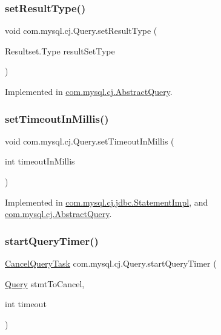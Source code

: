 \subsubsection{\texorpdfstring{set\+Result\+Type()}{setResultType()}}
{\footnotesize\ttfamily void com.\+mysql.\+cj.\+Query.\+set\+Result\+Type (\begin{DoxyParamCaption}\item[{Resultset.\+Type}]{result\+Set\+Type }\end{DoxyParamCaption})}



Implemented in \mbox{\hyperlink{classcom_1_1mysql_1_1cj_1_1_abstract_query_a169b32f7a5ede30f551d3ee53b0c4ac4}{com.\+mysql.\+cj.\+Abstract\+Query}}.

\mbox{\label{interfacecom_1_1mysql_1_1cj_1_1_query_a9bdb29806cdcfabc9bf48c9c7872d777}} 
\subsubsection{\texorpdfstring{set\+Timeout\+In\+Millis()}{setTimeoutInMillis()}}
{\footnotesize\ttfamily void com.\+mysql.\+cj.\+Query.\+set\+Timeout\+In\+Millis (\begin{DoxyParamCaption}\item[{int}]{timeout\+In\+Millis }\end{DoxyParamCaption})}



Implemented in \mbox{\hyperlink{classcom_1_1mysql_1_1cj_1_1jdbc_1_1_statement_impl_a88a77da140cb220313f9f876f08ee0a1}{com.\+mysql.\+cj.\+jdbc.\+Statement\+Impl}}, and \mbox{\hyperlink{classcom_1_1mysql_1_1cj_1_1_abstract_query_adcf9dfa4142b1922dc2fd8e09d70795a}{com.\+mysql.\+cj.\+Abstract\+Query}}.

\mbox{\label{interfacecom_1_1mysql_1_1cj_1_1_query_a05d5eedcc76ab8fe224f4e2df0e4d274}} 
\subsubsection{\texorpdfstring{start\+Query\+Timer()}{startQueryTimer()}}
{\footnotesize\ttfamily \mbox{\hyperlink{interfacecom_1_1mysql_1_1cj_1_1_cancel_query_task}{Cancel\+Query\+Task}} com.\+mysql.\+cj.\+Query.\+start\+Query\+Timer (\begin{DoxyParamCaption}\item[{\mbox{\hyperlink{interfacecom_1_1mysql_1_1cj_1_1_query}{Query}}}]{stmt\+To\+Cancel,  }\item[{int}]{timeout }\end{DoxyParamCaption})}



